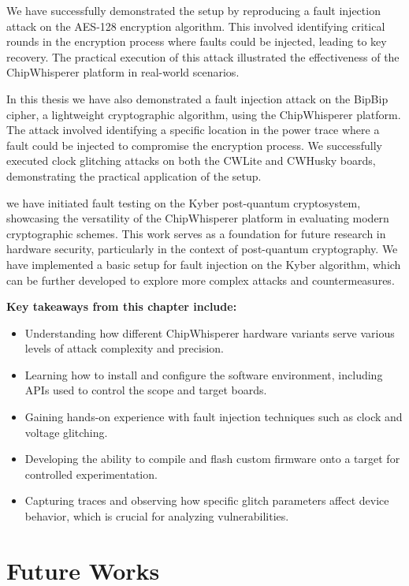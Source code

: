 We have successfully demonstrated the setup by reproducing a fault injection attack on the AES-128 encryption algorithm. This involved identifying critical rounds in the encryption process where faults could be injected, leading to key recovery. The practical execution of this attack illustrated the effectiveness of the ChipWhisperer platform in real-world scenarios.

In this thesis we have also demonstrated a fault injection attack on the BipBip cipher, a lightweight cryptographic algorithm, using the ChipWhisperer platform. The attack involved identifying a specific location in the power trace where a fault could be injected to compromise the encryption process. We successfully executed clock glitching attacks on both the CWLite and CWHusky boards, demonstrating the practical application of the setup.

we have initiated fault testing on the Kyber post-quantum cryptosystem, showcasing the versatility of the ChipWhisperer platform in evaluating modern cryptographic schemes. This work serves as a foundation for future research in hardware security, particularly in the context of post-quantum cryptography. We have implemented a basic setup for fault injection on the Kyber algorithm, which can be further developed to explore more complex attacks and countermeasures.

\textbf{Key takeaways from this chapter include:}

\begin{itemize}
  \item Understanding how different ChipWhisperer hardware variants serve various levels of attack complexity and precision.
  \item Learning how to install and configure the software environment, including APIs used to control the scope and target boards.
  \item Gaining hands-on experience with fault injection techniques such as clock and voltage glitching.
  \item Developing the ability to compile and flash custom firmware onto a target for controlled experimentation.
  \item Capturing traces and observing how specific glitch parameters affect device behavior, which is crucial for analyzing vulnerabilities.
\end{itemize}

\bigskip

\section*{Future Works}

